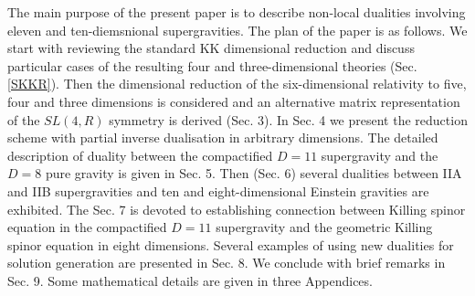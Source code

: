 \documentclass[a4paper,12pt]{article}
\begin{document}
The main purpose of the present paper is to describe non-local
dualities involving eleven and ten-diemsnional supergravities.
The plan of the paper is as follows. We start with reviewing the
standard KK dimensional reduction and discuss particular cases
of the resulting four and three-dimensional theories (Sec.
\ref{SKKR}). Then the dimensional reduction of the
six-dimensional relativity to five, four and three dimensions
is considered and an alternative matrix representation of the
$SL(4,R)$ symmetry is derived (Sec. 3). In Sec. 4 we present
the reduction scheme with partial inverse dualisation in
arbitrary dimensions. The detailed description of duality
between the compactified $D=11$ supergravity and the $D=8$ pure
gravity is given in Sec. 5. Then (Sec. 6) several dualities
between IIA and IIB supergravities and ten and
eight-dimensional Einstein gravities are exhibited. The Sec. 7
is devoted to establishing connection between Killing spinor
equation in the compactified $D=11$ supergravity and the
geometric Killing spinor equation in eight dimensions. Several
examples of using new dualities for solution generation are
presented in Sec. 8. We conclude with brief remarks in Sec. 9.
Some mathematical details are given in three Appendices.


\end{document}
